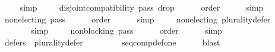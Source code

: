 \begin{isabellebody}
\ \ \ \ \isamarkupfalse%
\ simp\isanewline
\isanewline
\ \ \isamarkupfalse%
\ {}{}{}{}{\isacharcolon}{\kern0pt}\ {\isachardoublequoteopen}disjoint{\isacharunderscore}{\kern0pt}compatibility\ {\isacharquery}{\kern0pt}pass{}\ {\isacharquery}{\kern0pt}drop{}{\isachardoublequoteclose}\isanewline
\ \ \ \ \isamarkupfalse%
\ order\isanewline
\ \ \ \ \isamarkupfalse%
\ simp\ \isanewline
\ \ \isamarkupfalse%
\ {}{}{}{}{\isacharcolon}{\kern0pt}\ {\isachardoublequoteopen}non{\isacharunderscore}{\kern0pt}electing\ {\isacharquery}{\kern0pt}pass{}{\isachardoublequoteclose}\isanewline
\ \ \ \ \isamarkupfalse%
\ order\isanewline
\ \ \ \ \isamarkupfalse%
\ simp\isanewline
\ \ \isamarkupfalse%
\ {}{}{}{}{\isacharcolon}{\kern0pt}\ {\isachardoublequoteopen}non{\isacharunderscore}{\kern0pt}electing\ {\isacharquery}{\kern0pt}plurality{\isacharunderscore}{\kern0pt}defer{\isachardoublequoteclose}\isanewline
\ \ \ \ \isamarkupfalse%
\ {}{}{}{}{}\ {}{}{}{}{}\isanewline
\ \ \ \ \isamarkupfalse%
\ simp\isanewline
\ \ \isamarkupfalse%
\ {}{}{}{}{\isacharcolon}{\kern0pt}\ {\isachardoublequoteopen}non{\isacharunderscore}{\kern0pt}blocking\ {\isacharquery}{\kern0pt}pass{}{\isachardoublequoteclose}\isanewline
\ \ \ \ \isamarkupfalse%
\ order\isanewline
\ \ \ \ \isamarkupfalse%
\ simp\isanewline
\ \ \isamarkupfalse%
\ {}{}{}{}{\isacharcolon}{\kern0pt}\ {\isachardoublequoteopen}defers\ {}\ {\isacharquery}{\kern0pt}plurality{\isacharunderscore}{\kern0pt}defer{\isachardoublequoteclose}\isanewline
\ \ \ \ \isamarkupfalse%
\ {}{}{}{}{}\ {}{}{}{}{}\ {}{}{}{}{}\ seq{\isacharunderscore}{\kern0pt}comp{\isacharunderscore}{\kern0pt}def{\isacharunderscore}{\kern0pt}one\isanewline
\ \ \ \ \isamarkupfalse%
\ blast\isanewline
\isanewline
\ \ \isamarkupfalse%

\end{isabellebody}
